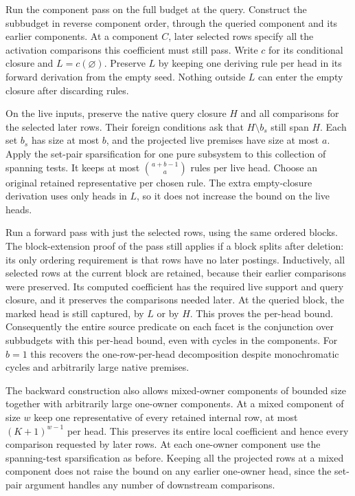 Run the component pass on the full budget at the
query. Construct the subbudget in reverse component
order, through the queried component and its earlier
components. At a component $C$, later selected rows
specify all the activation comparisons this coefficient
must still pass. Write $c$ for its conditional closure
and $L=c(\varnothing)$. Preserve $L$ by keeping one
deriving rule per head in its forward derivation
from the empty seed. Nothing outside $L$ can enter
the empty closure after discarding rules.

On the live inputs, preserve the native query
closure $H$ and all comparisons for the selected
later rows. Their foreign conditions ask that
$H\setminus b_s$ still span $H$. Each set $b_s$
has size at most $b$, and the projected live
premises have size at most $a$. Apply the set-pair
sparsification for one pure subsystem to this
collection of spanning tests. It keeps at most
$\binom{a+b-1}{a}$ rules per live head. Choose an
original retained representative per chosen rule.
The extra empty-closure derivation uses only heads
in $L$, so it does not increase the bound on the
live heads.

Run a forward pass with just the selected rows,
using the same ordered blocks. The block-extension
proof of the pass still applies if a block splits
after deletion: its only ordering requirement is
that rows have no later postings. Inductively,
all selected rows at the current block are retained,
because their earlier comparisons were preserved.
Its computed coefficient has the required live
support and query closure, and it preserves the
comparisons needed later. At the queried block, the
marked head is still captured, by $L$ or by $H$.
This proves the per-head bound. Consequently the
entire source predicate on each facet is the
conjunction over subbudgets with this per-head
bound, even with cycles in the components.
For $b=1$ this recovers the one-row-per-head
decomposition despite monochromatic cycles and
arbitrarily large native premises.

The backward construction also allows mixed-owner
components of bounded size together with arbitrarily
large one-owner components. At a mixed component of
size $w$ keep one representative of every retained
internal row, at most $(K+1)^{w-1}$ per head. This
preserves its entire local coefficient and hence
every comparison requested by later rows. At each
one-owner component use the spanning-test
sparsification as before. Keeping all the projected
rows at a mixed component does not raise the bound
on any earlier one-owner head, since the set-pair
argument handles any number of downstream comparisons.

